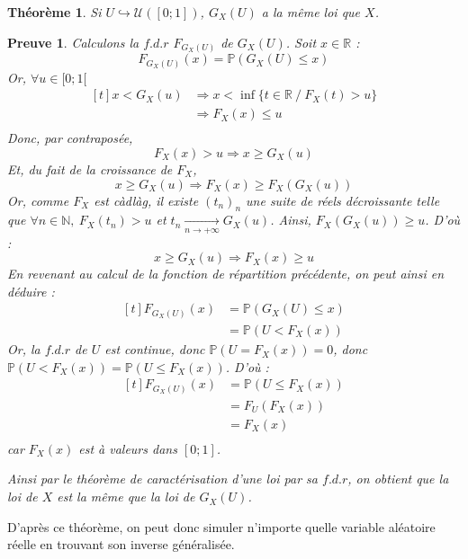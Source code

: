 \documentclass[a4paper, titlepage]{livret} %
\newtheorem*{thm}{Théorème} %
\newtheorem*{prv}{\textbf{Preuve}}
\begin{document}
			\begin{thm}
				Si $U \hookrightarrow \mathcal{U}([0;1])$, $G_{X}(U)$ a la même loi que $X$.
			\end{thm}
			\begin{prv}
				Calculons la $f.d.r$ $F_{G_{X}(U)}$ de $G_{X}(U)$.
				Soit $x \in \mathbb{R}$ :
				\[
					F_{G_{X}(U)}(x) = \mathbb{P}(G_{X}(U) \leq x)
				\]
				Or, $\forall u \in [0;1[$
				\[\begin{aligned}[t]
					x < G_{X}(u) & \Rightarrow x < \inf{\{t \in \mathbb{R} \ / \ F_{X}(t) > u\}}\\
								 & \Rightarrow F_{X}(x) \leq u \\
				\end{aligned}\]
				Donc, par contraposée,
				\[\boxed{
					F_{X}(x) > u \Rightarrow x \geq G_{X}(u)
				}\]
				Et, du fait de la croissance de $F_{X}$,
				\[
					x \geq G_{X}(u) \Rightarrow F_{X}(x) \geq F_{X}(G_{X}(u))
				\]
				Or, comme $F_{X}$ est \textit{càdlàg}, il existe $(t_{n})_{n}$ une suite de réels décroissante telle que $\forall n \in \mathbb{N}, \ F_{X}(t_{n}) > u$ et $t_{n} \underset{n \to +\infty}{\longrightarrow} G_{X}(u)$.
				Ainsi, $F_{X}(G_{X}(u)) \geq u$.
				D'où :
				\[\boxed{
					x \geq G_{X}(u) \Rightarrow F_{X}(x) \geq u
				}\]
				En revenant au calcul de la fonction de répartition précédente, on peut ainsi en déduire :
				\[\begin{aligned}[t]
					F_{G_{X}(U)}(x) & = \mathbb{P}(G_{X}(U) \leq x)\\
									& = \mathbb{P}(U < F_{X}(x))
				\end{aligned}\]
				Or, la $f.d.r$ de $U$ est continue, donc $\mathbb{P}(U = F_{X}(x)) = 0$, donc $\mathbb{P}(U < F_{X}(x)) = \mathbb{P}(U \leq F_{X}(x))$.
				D'où :
				\[\begin{aligned}[t]
					F_{G_{X}(U)}(x) & = \mathbb{P}(U \leq F_{X}(x))\\
									& = F_{U}(F_{X}(x)) \\
									& = F_{X}(x) \\
				\end{aligned}\]
				car $F_{X}(x)$ est à valeurs dans $[0;1]$.

				Ainsi par le théorème de caractérisation d'une loi par sa $f.d.r$, on obtient que la loi de $X$ est la même que la loi de $G_{X}(U)$.
			\end{prv}

			D'après ce théorème, on peut donc simuler n'importe quelle variable aléatoire réelle en trouvant son inverse généralisée.
\end{document}
